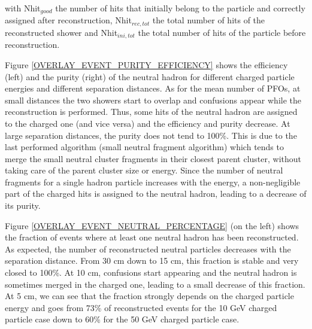 \documentclass[cits]{JINST}
\begin{document}
with Nhit$_{good}$ the number of hits that initially belong to the particle and correctly assigned after reconstruction, Nhit$_{rec,tot}$ the total number of hits of the reconstructed shower and Nhit$_{ini,tot}$ the total number of hits of the particle before reconstruction. 

Figure \ref{OVERLAY_EVENT_PURITY_EFFICIENCY} shows the efficiency (left) and the purity (right) of the neutral hadron for different charged particle energies and different separation distances. As for the mean number of PFOs, at small distances the two showers start to overlap and confusions appear while the reconstruction is performed. Thus, some hits of the neutral hadron are assigned to the charged one (and vice versa) and the efficiency and purity decrease. At large separation distances, the purity does not tend to 100\%. This is due to the last performed algorithm (small neutral fragment algorithm) which tends to merge the small neutral cluster fragments in their closest parent cluster, without taking care of the parent cluster size or energy. Since the number of neutral fragments for a single hadron particle increases with the energy, a non-negligible part of the charged hits is assigned to the neutral hadron, leading to a decrease of its purity.

Figure \ref{OVERLAY_EVENT_NEUTRAL_PERCENTAGE} (on the left) shows the fraction of events where at least one neutral hadron has been reconstructed. As expected, the number of reconstructed neutral particles decreases with the separation distance. From 30 cm down to 15 cm, this fraction is stable and very closed to 100\%. At 10 cm, confusions start appearing and the neutral hadron is sometimes merged in the charged one, leading to a small decrease of this fraction. At 5 cm, we can see that the fraction strongly depends on the charged particle energy and goes from 73\% of reconstructed events for the 10 GeV charged particle case down to 60\% for the 50 GeV charged particle case.
\end{document}

